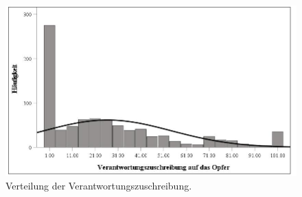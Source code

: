 \begin{figure}[htb]
    \centering
        \includegraphics[width=0.8\linewidth]{Histogramm VicBlame.jpg}
        \caption[Histogramm Verantwortungszuschreibung]{Verteilung der Verantwortungszuschreibung.}
        \label{Histogramm VicBlame}
\end{figure}

